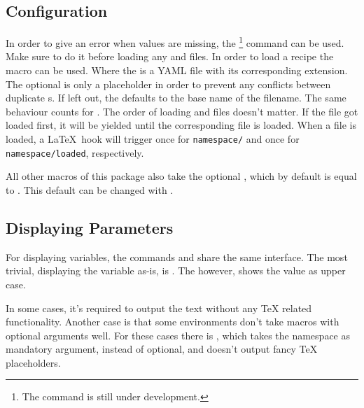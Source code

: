 \documentclass{ltxdoc}
\begin{document}
    \subsection{Configuration}
    \DescribeMacro{\strictparams} In order to give an error when values are missing, the \cmd{\strictparams}\footnote{The \cmd{\strictparams} command is still under development.} command can be used.
    Make sure to do it before loading any  and  files.
    \DescribeMacro{\loadrecipe}
    In order to load a recipe the macro \cmd{\loadrecipe} can be used.
    Where the  is a YAML file with its corresponding extension.
    The optional  is only a placeholder in order to prevent any conflicts between duplicate s.
    If left out, the  defaults to the base name of the filename.
    \DescribeMacro{\loadpayload} The same behaviour counts for \cmd{\loadpayload}.
    The order of loading  and  files doesn't matter.
    If the  file got loaded first, it will be yielded until the corresponding  file is loaded.
    When a file is loaded, a \LaTeX\ hook will trigger once for \texttt{namespace/} and once for \texttt{namespace/loaded}, respectively.

    All other macros of this package also take the optional , which by default is equal to \cmd{\jobname}.
    \DescribeMacro{\setnamespace} This default  can be changed with \cmd{\setnamespace}.\\

    \subsection{Displaying Parameters}
    For displaying variables, the commands \cmd{\param} and \cmd{\PARAM} share the same interface.
    \DescribeMacro{\param} The most trivial, displaying the variable as-is, is \cmd{\param}.
    \DescribeMacro{\PARAM} The \cmd{\PARAM} however, shows the value as upper case.

    In some cases, it's required to output the text without any \TeX{} related functionality.
    Another case is that some environments don't take macros with optional arguments well.
    \DescribeMacro{\rawparam} For these cases there is \cmd{\rawparam}, which takes the namespace as mandatory argument, instead of optional, and doesn't output fancy \TeX{} placeholders.\\
\end{document}
